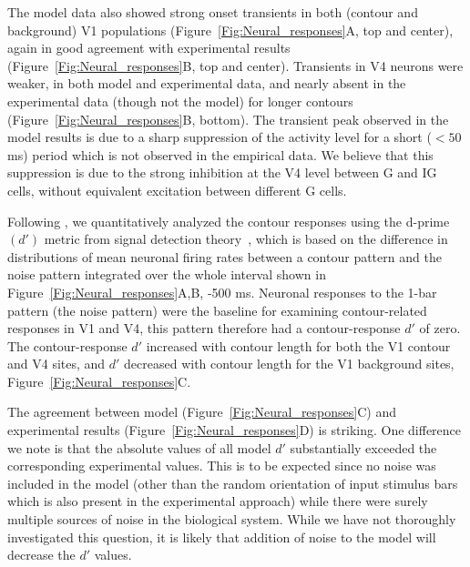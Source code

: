 The model data also showed strong onset transients in both (contour and background) V1 populations (Figure~\ref{Fig:Neural_responses}A,
top and center), again in good agreement with experimental results
(Figure~\ref{Fig:Neural_responses}B, top and center). Transients in V4
neurons were weaker, in both model and experimental data, and nearly
absent in the experimental data (though not the model) for longer
contours (Figure~\ref{Fig:Neural_responses}B, bottom). The transient peak observed in the model results is due to a sharp suppression of the activity level for a short ($<50$ms) period which is not observed in the empirical data. We believe that this suppression is due to the  strong inhibition at the V4 level between G and IG cells, without equivalent excitation between different G cells.

Following \cite{Chen_etal14}, we quantitatively analyzed the contour responses using the d-prime $(d')$ metric from signal detection theory~\citep{Green_Swets66}, which is based on the difference in distributions of mean neuronal firing rates between a contour pattern and the noise pattern integrated over the whole interval shown in Figure~\ref{Fig:Neural_responses}A,B, -500 ms. Neuronal responses to the 1-bar pattern (the noise pattern) were the baseline for examining contour-related responses in V1 and V4, this pattern therefore had a contour-response $d'$ of zero. The contour-response $d'$ increased with contour length for both the V1 contour and V4 sites, and $d'$ decreased with contour length for the V1 background sites, Figure~\ref{Fig:Neural_responses}C.

The agreement between model (Figure~\ref{Fig:Neural_responses}C) and
experimental results (Figure~\ref{Fig:Neural_responses}D) is striking.
One difference we note is that the absolute values of all model $d'$
substantially exceeded the corresponding experimental values. This is to be expected since no noise was included in the model (other than the random orientation of input stimulus bars which is also present in the experimental approach) while there were surely multiple sources of noise in the biological system. While we have not thoroughly investigated this question, it is likely that addition of noise to the model will decrease the $d'$ values.

